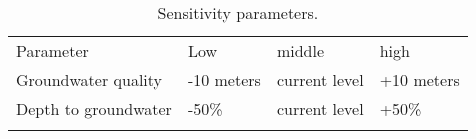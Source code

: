 \begin{table}[!ht]
	\caption{\label{tbl:sensitivy}Sensitivity parameters.}
	\begin{indented}
	\item[]\begin{tabular}{@{}l l l l}
		\br
		Parameter & Low & middle & high\\
		\mr
		Groundwater quality & -10 meters & current level & +10 meters\\
		Depth to groundwater & -50\% & current level & +50\%\\
		\br
	\end{tabular}
	\end{indented}
\end{table}